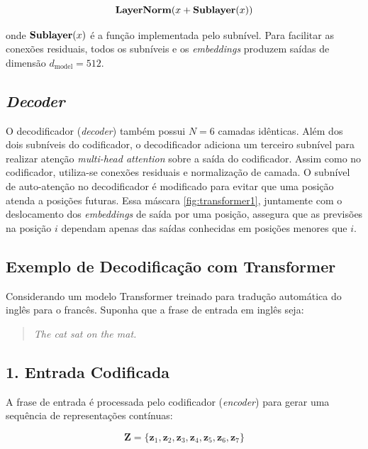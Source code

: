 \begin{equation}
\text{\textbf{LayerNorm}}(x + \text{\textbf{Sublayer}}(x))
\label{eq:layernorm}
\end{equation}

onde $\text{\textbf{Sublayer}}(x)$ é a função implementada pelo subnível. Para facilitar as conexões residuais, todos os subníveis e os \textit{embeddings} produzem saídas de dimensão $d_{\text{model}} = 512$.

\subsection*{\textit{Decoder}}

O decodificador (\textit{decoder}) também possui $N = 6$ camadas idênticas. Além dos dois subníveis do codificador, o decodificador adiciona um terceiro subnível para realizar atenção \textit{multi-head attention} sobre a saída do codificador. Assim como no codificador, utiliza-se conexões residuais e normalização de camada. O subnível de auto-atenção no decodificador é modificado para evitar que uma posição atenda a posições futuras. Essa máscara \ref{fig:transformer1}, juntamente com o deslocamento dos \textit{embeddings} de saída por uma posição, assegura que as previsões na posição $i$ dependam apenas das saídas conhecidas em posições menores que $i$.

\subsection*{Exemplo de Decodificação com Transformer}

Considerando um modelo Transformer treinado para tradução automática do inglês para o francês. Suponha que a frase de entrada em inglês seja:

\begin{quote}
\textit{The cat sat on the mat.}
\end{quote}

\subsection*{1. Entrada Codificada}

A frase de entrada é processada pelo codificador (\textit{encoder}) para gerar uma sequência de representações contínuas:

\[
\textbf{Z} = \{ \textbf{z}_1, \textbf{z}_2, \textbf{z}_3, \textbf{z}_4, \textbf{z}_5, \textbf{z}_6, \textbf{z}_7 \}
\]


